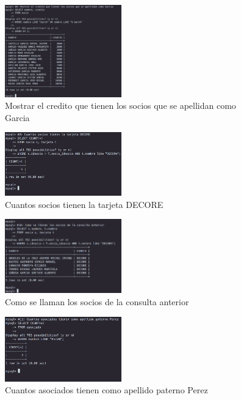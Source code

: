 \documentclass[12pt, fleqn]{article}                             %
\begin{document}
        \begin{figure}[ht!]
            \centering
            \includegraphics[width=0.45\textwidth]{BD3Reporte7}
            \caption{Mostrar el credito que tienen los socios que se apellidan como Garcia}
        \end{figure}

        \begin{figure}[ht!]
            \centering
            \includegraphics[width=0.45\textwidth]{BD3Reporte8}
            \caption{Cuantos socios tienen la tarjeta DECORE}
        \end{figure}

        \begin{figure}[ht!]
            \centering
            \includegraphics[width=0.45\textwidth]{BD3Reporte9}
            \caption{Como se llaman los socios de la consulta anterior}
        \end{figure}

        \begin{figure}[ht!]
            \centering
            \includegraphics[width=0.45\textwidth]{BD3Reporte10}
            \caption{Cuantos asociados tienen como apellido paterno Perez}
        \end{figure}
\end{document}
